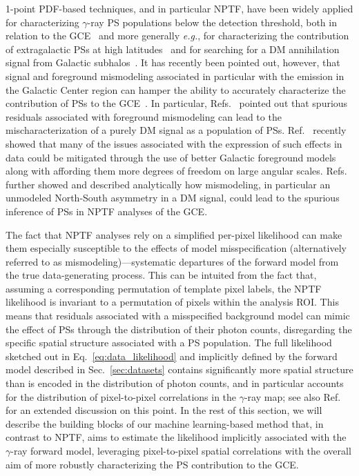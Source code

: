 \documentclass[prd,aps,10pt,nofootinbib,twocolumn,superscriptaddress,preprintnumbers,balancelastpage,longbibliography,floatfix]{revtex4-2}
\begin{document}
1-point PDF-based techniques, and in particular NPTF, have been widely applied for characterizing $\gamma$-ray PS populations below the \Fermi detection threshold, both in relation to the GCE~\cite{Lee:2015fea,Leane:2020pfc,Leane:2020nmi,Buschmann:2020adf,Calore:2021bty} and more generally \emph{e.g.}, for characterizing the contribution of extragalactic PSs at high latitudes~\cite{Lisanti:2016jub,Zechlin:2016pme,Zechlin:2015wdz} and for searching for a DM annihilation signal from Galactic subhalos~\cite{Somalwar:2020awt}. It has recently been pointed out, however, that signal and foreground mismodeling associated in particular with the emission in the Galactic Center region can hamper the ability to accurately characterize the contribution of PSs to the GCE~\cite{Leane:2019xiy,Leane:2020pfc}. In particular, Refs.~\cite{Lee:2015fea,Leane:2019xiy,Chang:2019ars} pointed out that spurious residuals associated with foreground mismodeling can lead to the mischaracterization of a purely DM signal as a population of PSs. Ref.~\cite{Buschmann:2020adf} recently showed that many of the issues associated with the expression of such effects in \Fermi data could be mitigated through the use of better Galactic foreground models along with affording them more degrees of freedom on large angular scales.
Refs.~\cite{Leane:2020pfc,Leane:2020nmi} further showed and described analytically how mismodeling, in particular an unmodeled North-South asymmetry in a DM signal, could lead to the spurious inference of PSs in NPTF analyses of the GCE. %

The fact that NPTF analyses rely on a simplified per-pixel likelihood can make them especially susceptible to the effects of model misspecification (alternatively referred to as mismodeling)---systematic departures of the forward model from the true data-generating process. This can be intuited from the fact that, assuming a corresponding permutation of template pixel labels, the NPTF likelihood is invariant to a permutation of pixels within the analysis ROI. This means that residuals associated with a misspecified background model can mimic the effect of PSs through the distribution of their photon counts, disregarding the specific spatial structure associated with a PS population. The full likelihood sketched out in Eq.~\eqref{eq:data_likelihood} and implicitly defined by the forward model described in Sec.~\ref{sec:datasets} contains significantly more spatial structure than is encoded in the distribution of photon counts, and in particular accounts for the distribution of pixel-to-pixel correlations in the $\gamma$-ray map; see also Ref.~\cite{List:2021aer} for an extended discussion on this point.
In the rest of this section, we will describe the building blocks of our machine learning-based method that, in contrast to NPTF, aims to estimate the likelihood implicitly associated with the $\gamma$-ray forward model, leveraging pixel-to-pixel spatial correlations with the overall aim of more robustly characterizing the PS contribution to the GCE.
\end{document}
